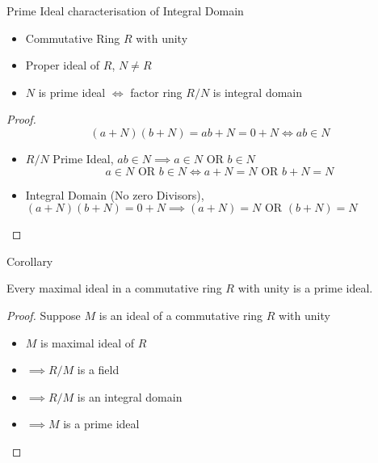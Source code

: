 \documentclass{beamer}
\begin{document}
\begin{frame}{Prime Ideal characterisation of Integral Domain}
\begin{theorem}
\begin{itemize}
	\item Commutative Ring $R$ with unity
	\item Proper ideal of $R$, $N \ne R$
	\item $N$ is prime ideal $\iff$ factor ring $R/N$ is integral domain
\end{itemize}
\end{theorem}
\begin{proof}
	$$(a+N)(b+N) = ab + N = 0 + N \iff ab \in N$$
\begin{itemize}
	\item $R/N$ Prime Ideal,  
		$ab \in N \implies a \in N \text{ OR } b \in N$
	$$a \in N \text{ OR } b \in N \iff a + N = N \text{ OR } b+N = N$$
	\item Integral Domain (No zero Divisors), 
		$(a+N)(b+N) = 0+N \implies (a+N) = N \text{ OR } (b+N) = N$
\end{itemize}
\end{proof}
\end{frame}

\begin{frame}{Corollary}
\begin{corollary}
	Every maximal ideal in a commutative ring $R$ with unity is a prime ideal.
\end{corollary}
\begin{proof}
	Suppose $M$ is an ideal of a commutative ring $R$ with unity
\begin{itemize}
	\item $M$ is maximal ideal of $R$
	\item $\implies R/M$ is a field
	\item $\implies R/M$ is an integral domain
	\item $\implies M$ is a prime ideal
\end{itemize}
\end{proof}
\end{frame}
\end{document}
